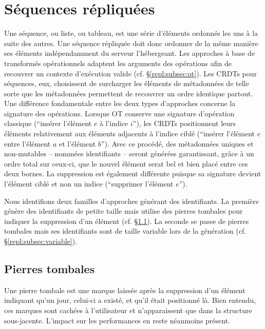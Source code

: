 
\section{Séquences répliquées}
\label{repl:sec:sequences}

Une séquence, ou liste, ou tableau, est une série d'éléments ordonnés les uns à
la suite des autres. Une séquence répliquée doit donc ordonner de la même
manière ses éléments indépendamment du serveur l'hébergeant. Les approches à
base de transformés opérationnels adaptent les arguments des opérations afin de
recouvrer un contexte d'exécution valide (cf. §\ref{repl:subsec:ot}). Les CRDTs
pour séquences, eux, choisissent de surcharger les éléments de métadonnées de
telle sorte que les métadonnées permettent de recouvrer un ordre identique
partout. Une différence fondamentale entre les deux types d'approches concerne
la signature des opérations. Lorsque OT conserve une signature d'opération
classique (``insérer l'élément $e$ à l'indice $i$''), les CRDTs positionnent
leurs éléments relativement aux éléments adjacents à l'indice ciblé (``insérer
l'élément $e$ entre l'élément $a$ et l'élément $b$''). Avec ce procédé, des
métadonnées uniques et non-mutables -- nommées identifiants -- seront générées
garantissant, grâce à un ordre total sur ceux-ci, que le nouvel élément serat
bel et bien placé entre ces deux bornes. La suppression est également différente
puisque sa signature devient l'élément ciblé et non un indice (``supprimer
l'élément $e$'').

Nous identifions deux familles d'approches générant des identifiants. La
première génère des identifiants de petite taille mais utilise des pierres
tombales pour indiquer la suppression d'un élément
(cf. §\ref{repl:subsec:tombstone}). La seconde se passe de pierres tombales mais
ses identifiants sont de taille variable lors de la génération
(cf. §\ref{repl:subsec:variable}).

\subsection{Pierres tombales}
\label{repl:subsec:tombstone}

Une pierre tombale est une marque laissée après la suppression d'un élément
indiquant qu'un jour, celui-ci a existé, et qu'il était positionné là. Bien
entendu, ces marques sont cachées à l'utilisateur et n'apparaissent que dans la
structure sous-jacente. L'impact sur les performances en reste néanmoins
présent.

